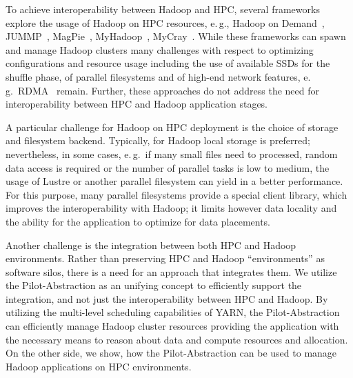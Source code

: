 To achieve interoperability between Hadoop and HPC, several frameworks explore the usage of Hadoop on HPC resources, e.\,g., Hadoop on Demand~\cite{hod}, JUMMP~\cite{moody2013jummp}, MagPie~\cite{chu2015magpie}, MyHadoop~\cite{krishnan2011myhadoop}, MyCray~\cite{mycray}.
While these frameworks can spawn and manage Hadoop clusters many challenges with respect to optimizing configurations and resource usage including the use of available SSDs for the shuffle phase, of parallel filesystems and of high-end network features, e.\,g.\ RDMA~\cite{rahman2014homr} remain.
Further, these approaches do not address the need for interoperability between HPC and Hadoop application stages.

A particular challenge for Hadoop on HPC deployment is the choice of storage and filesystem backend.
Typically, for Hadoop local storage is preferred; nevertheless, in some cases, e.\,g.\ if many small files need to processed, random data access is required or the number of parallel tasks is low to medium, the usage of Lustre or another parallel filesystem can yield in a better performance.
For this purpose, many parallel filesystems provide a special client library, which improves the interoperability with Hadoop; it limits however data locality and the ability for the application to optimize for data placements.

Another challenge is the integration between both HPC and Hadoop environments.
Rather than preserving HPC and Hadoop ``environments'' as software silos, there is a need for an approach that integrates them. 
We utilize the Pilot-Abstraction as an unifying concept to efficiently support the integration, and not just the interoperability between HPC and Hadoop.
By utilizing the multi-level scheduling capabilities of YARN, the Pilot-Abstraction can efficiently manage Hadoop cluster resources providing the application with the necessary means to reason about data and compute resources and allocation.
On the other side, we show, how the Pilot-Abstraction can be used to manage Hadoop applications on HPC environments.


